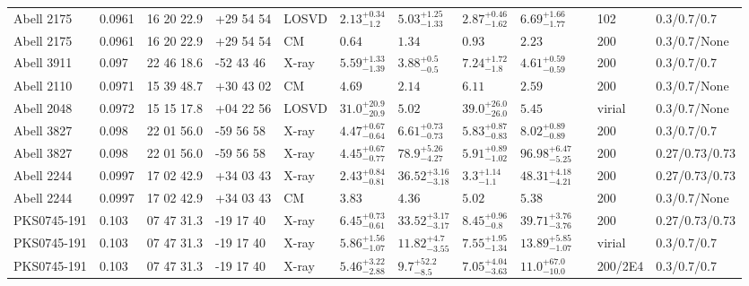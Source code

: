 \begin{landscape}
\begin{center}
{\begin{longtable}{llllllllllll}
Abell 2175 & 0.0961 & 16 20 22.9 & +29 54 54 & LOSVD & ${2.13}^{+0.34}_{-1.2}$ & ${5.03}^{+1.25}_{-1.33}$ & ${2.87}^{+0.46}_{-1.62}$ & ${6.69}^{+1.66}_{-1.77}$ & \citet{WO10.1} & 102 & 0.3/0.7/0.7 \\
Abell 2175 & 0.0961 & 16 20 22.9 & +29 54 54 & CM & ${0.64}^{}_{}$ & ${1.34}^{}_{}$ & ${0.93}^{}_{}$ & ${2.23}^{}_{}$ & \citet{RI06.1} & 200 & 0.3/0.7/None \\
Abell 3911 & 0.097 & 22 46 18.6 & -52 43 46 & X-ray & ${5.59}^{+1.33}_{-1.39}$ & ${3.88}^{+0.5}_{-0.5}$ & ${7.24}^{+1.72}_{-1.8}$ & ${4.61}^{+0.59}_{-0.59}$ & \citet{ET11.1} & 200 & 0.3/0.7/0.7 \\
Abell 2110 & 0.0971 & 15 39 48.7 & +30 43 02 & CM & ${4.69}^{}_{}$ & ${2.14}^{}_{}$ & ${6.11}^{}_{}$ & ${2.59}^{}_{}$ & \citet{RI06.1} & 200 & 0.3/0.7/None \\
Abell 2048 & 0.0972 & 15 15 17.8 & +04 22 56 & LOSVD & ${31.0}^{+20.9}_{-20.9}$ & ${5.02}^{}_{}$ & ${39.0}^{+26.0}_{-26.0}$ & ${5.45}^{}_{}$ & \citet{AB11.1} & virial & 0.3/0.7/None \\
Abell 3827 & 0.098 & 22 01 56.0 & -59 56 58 & X-ray & ${4.47}^{+0.67}_{-0.64}$ & ${6.61}^{+0.73}_{-0.73}$ & ${5.83}^{+0.87}_{-0.83}$ & ${8.02}^{+0.89}_{-0.89}$ & \citet{ET11.1} & 200 & 0.3/0.7/0.7 \\
Abell 3827 & 0.098 & 22 01 56.0 & -59 56 58 & X-ray & ${4.45}^{+0.67}_{-0.77}$ & ${78.9}^{+5.26}_{-4.27}$ & ${5.91}^{+0.89}_{-1.02}$ & ${96.98}^{+6.47}_{-5.25}$ & \citet{BA14.1} & 200 & 0.27/0.73/0.73 \\
Abell 2244 & 0.0997 & 17 02 42.9 & +34 03 43 & X-ray & ${2.43}^{+0.84}_{-0.81}$ & ${36.52}^{+3.16}_{-3.18}$ & ${3.3}^{+1.14}_{-1.1}$ & ${48.31}^{+4.18}_{-4.21}$ & \citet{BA14.1} & 200 & 0.27/0.73/0.73 \\
Abell 2244 & 0.0997 & 17 02 42.9 & +34 03 43 & CM & ${3.83}^{}_{}$ & ${4.36}^{}_{}$ & ${5.02}^{}_{}$ & ${5.38}^{}_{}$ & \citet{RI06.1} & 200 & 0.3/0.7/None \\
PKS0745-191 & 0.103 & 07 47 31.3 & -19 17 40 & X-ray & ${6.45}^{+0.73}_{-0.61}$ & ${33.52}^{+3.17}_{-3.17}$ & ${8.45}^{+0.96}_{-0.8}$ & ${39.71}^{+3.76}_{-3.76}$ & \citet{BA14.1} & 200 & 0.27/0.73/0.73 \\
PKS0745-191 & 0.103 & 07 47 31.3 & -19 17 40 & X-ray & ${5.86}^{+1.56}_{-1.07}$ & ${11.82}^{+4.7}_{-3.55}$ & ${7.55}^{+1.95}_{-1.34}$ & ${13.89}^{+5.85}_{-1.07}$ & \citet{SC07.1} & virial & 0.3/0.7/0.7 \\
PKS0745-191 & 0.103 & 07 47 31.3 & -19 17 40 & X-ray & ${5.46}^{+3.22}_{-2.88}$ & ${9.7}^{+52.2}_{-8.5}$ & ${7.05}^{+4.04}_{-3.63}$ & ${11.0}^{+67.0}_{-10.0}$ & \citet{VO06.1} & 200/2E4 & 0.3/0.7/0.7 \\

\end{longtable}}
\end{center}
\end{landscape}

